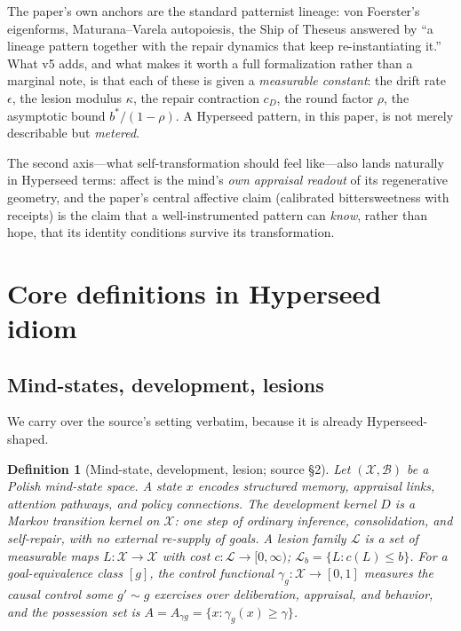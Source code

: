 \documentclass[11pt]{article}
\newtheorem{definition}{Definition}
\newcommand{\X}{\mathcal{X}}
\newcommand{\D}{D}
\newcommand{\Les}{\mathcal{L}}
\begin{document}
The paper's own anchors are the standard patternist lineage: von Foerster's eigenforms,
Maturana--Varela autopoiesis, the Ship of Theseus answered by ``a lineage pattern together
with the repair dynamics that keep re-instantiating it.'' What v5 adds, and what makes it
worth a full formalization rather than a marginal note, is that each of these is given a
\emph{measurable constant}: the drift rate $\epsilon$, the lesion modulus $\kappa$, the
repair contraction $c_{\D}$, the round factor $\rho$, the asymptotic bound
$b^{*}/(1-\rho)$. A Hyperseed pattern, in this paper, is not merely describable but
\emph{metered}.

The second axis---what self-transformation should feel like---also lands naturally in
Hyperseed terms: affect is the mind's \emph{own appraisal readout} of its regenerative
geometry, and the paper's central affective claim (calibrated bittersweetness with
receipts) is the claim that a well-instrumented pattern can \emph{know}, rather than hope,
that its identity conditions survive its transformation.

\section{Core definitions in Hyperseed idiom}

\subsection{Mind-states, development, lesions}

We carry over the source's setting verbatim, because it is already Hyperseed-shaped.

\begin{definition}[Mind-state, development, lesion; source \S2]\label{def:setting}
Let $(\X, \mathcal{B})$ be a Polish mind-state space. A state $x$ encodes structured
memory, appraisal links, attention pathways, and policy connections. The
\emph{development kernel} $\D$ is a Markov transition kernel on $\X$: one step of
ordinary inference, consolidation, and self-repair, with no external re-supply of goals.
A \emph{lesion family} $\Les$ is a set of measurable maps $L : \X \to \X$ with cost
$c : \Les \to [0,\infty)$; $\Les_b = \{L : c(L) \le b\}$. For a goal-equivalence class
$[g]$, the \emph{control functional} $\gamma_g : \X \to [0,1]$ measures the causal
control some $g' \sim g$ exercises over deliberation, appraisal, and behavior, and the
possession set is $A = A_{\gamma g} = \{x : \gamma_g(x) \ge \gamma\}$.
\end{definition}
\end{document}
